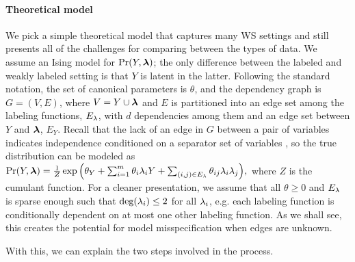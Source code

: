 \paragraph{Theoretical model}
We pick a simple theoretical model that captures many WS settings and still presents all of the challenges for comparing between the types of data. We assume an Ising model for $\Pr(Y, \bm{\lambda})$; the only difference between the labeled and weakly labeled setting is that $Y$ is latent in the latter. Following the standard notation,
the set of canonical parameters is $\theta$, and the dependency graph is $G = (V, E)$, where $V = Y \cup \bm{\lambda}$ and $E$ is partitioned into an edge set among the labeling functions, $E_{\lambda}$, with $d$ dependencies among them and an edge set between $Y$ and $\bm{\lambda}$, $E_Y$. %
Recall that the lack of an edge in $G$ between a pair of
variables indicates independence conditioned on a separator set of
variables \cite{Lauritzen}, so the true distribution can be modeled as
$%
    \Pr(Y, \bm{\lf}) = \frac{1}{Z} \exp \Big(\theta_Y + \sum_{i = 1}^m \theta_i \lf_i Y + \sum_{(i, j) \in E_{\lf}} \theta_{ij} \lf_i \lf_j \Big),
    \label{eq:true_pgm}
$%
where $Z$ is the cumulant function. For a cleaner presentation, we assume that all $\theta \ge 0$ and $E_{\lambda}$ is sparse enough such that $\text{deg}(\lambda_i) \le 2$ for all $\lambda_i$, e.g. each labeling function is conditionally dependent on at most one other labeling function. As we shall see, this creates the potential for model misspecification when edges are unknown.

With this, we can explain the two steps involved in the process.

